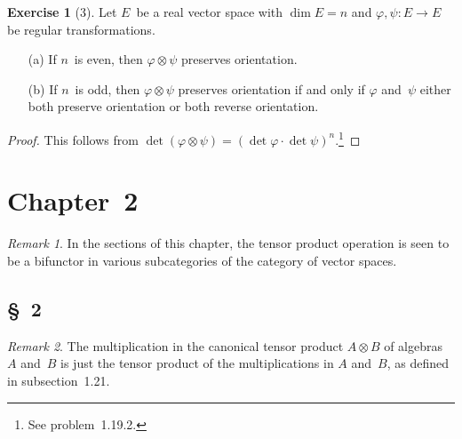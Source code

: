 \documentclass[letterpaper,12pt]{article}
\newcommand{\mult}{\cdot}
\newcommand{\tprod}{\otimes}
\theoremstyle{definition}
\newtheorem*{exer}{Exercise}
\theoremstyle{remark}
\newtheorem*{rmk}{Remark}
\begin{document}
\begin{exer}[3]
Let \(E\)~be a real vector space with \(\dim E=n\) and \(\varphi,\psi:E\to E\) be regular transformations.
\begin{enumerate}
\item[(a)] If \(n\)~is even, then \(\varphi\tprod\psi\) preserves orientation.
\item[(b)] If \(n\)~is odd, then \(\varphi\tprod\psi\) preserves orientation if and only if \(\varphi\) and~\(\psi\) either both preserve orientation or both reverse orientation.
\end{enumerate}
\end{exer}
\begin{proof}
This follows from \(\det(\varphi\tprod\psi)=(\det\varphi\mult\det\psi)^n\).\footnote{See problem~1.19.2.}
\end{proof}

\newpage
\section*{Chapter~2}
\begin{rmk}
In the sections of this chapter, the tensor product operation is seen to be a bifunctor in various subcategories of the category of vector spaces.
\end{rmk}

\subsection*{\S~2}
\begin{rmk}
The multiplication in the canonical tensor product \(A\tprod B\) of algebras \(A\) and~\(B\) is just the tensor product of the multiplications in \(A\) and~\(B\), as defined in subsection~1.21.
\end{rmk}
\end{document}
